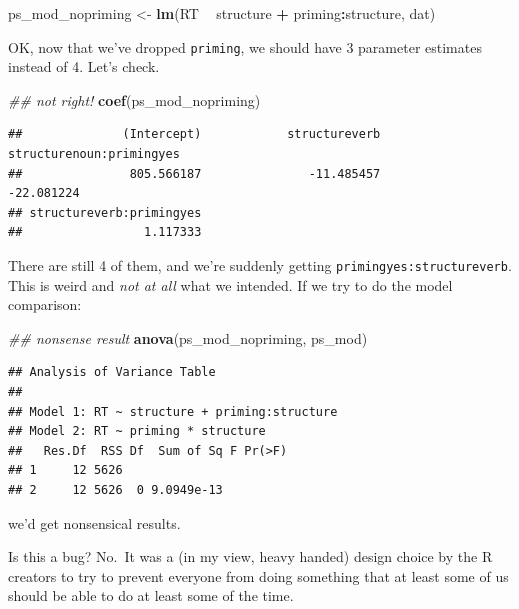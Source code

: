 \documentclass[]{book}
\newenvironment{Shaded}{\begin{snugshade}}{\end{snugshade}}
\newcommand{\CommentTok}[1]{\textcolor[rgb]{0.56,0.35,0.01}{\textit{#1}}}
\newcommand{\KeywordTok}[1]{\textcolor[rgb]{0.13,0.29,0.53}{\textbf{#1}}}
\newcommand{\NormalTok}[1]{#1}
\newcommand{\OperatorTok}[1]{\textcolor[rgb]{0.81,0.36,0.00}{\textbf{#1}}}
\newcommand{\StringTok}[1]{\textcolor[rgb]{0.31,0.60,0.02}{#1}}
\begin{document}
\begin{Shaded}
\begin{Highlighting}[]
\NormalTok{  ps_mod_nopriming <-}\StringTok{ }\KeywordTok{lm}\NormalTok{(RT }\OperatorTok{~}\StringTok{ }\NormalTok{structure }\OperatorTok{+}\StringTok{ }\NormalTok{priming}\OperatorTok{:}\NormalTok{structure, dat)}
\end{Highlighting}
\end{Shaded}

OK, now that we've dropped \texttt{priming}, we should have 3 parameter estimates instead of 4. Let's check.

\begin{Shaded}
\begin{Highlighting}[]
  \CommentTok{## not right!}
  \KeywordTok{coef}\NormalTok{(ps_mod_nopriming)}
\end{Highlighting}
\end{Shaded}

\begin{verbatim}
##              (Intercept)            structureverb structurenoun:primingyes 
##               805.566187               -11.485457               -22.081224 
## structureverb:primingyes 
##                 1.117333
\end{verbatim}

There are still 4 of them, and we're suddenly getting \texttt{primingyes:structureverb}. This is weird and \emph{not at all} what we intended. If we try to do the model comparison:

\begin{Shaded}
\begin{Highlighting}[]
  \CommentTok{## nonsense result}
  \KeywordTok{anova}\NormalTok{(ps_mod_nopriming, ps_mod)}
\end{Highlighting}
\end{Shaded}

\begin{verbatim}
## Analysis of Variance Table
## 
## Model 1: RT ~ structure + priming:structure
## Model 2: RT ~ priming * structure
##   Res.Df  RSS Df  Sum of Sq F Pr(>F)
## 1     12 5626                       
## 2     12 5626  0 9.0949e-13
\end{verbatim}

we'd get nonsensical results.

Is this a bug? No.~It was a (in my view, heavy handed) design choice by the R creators to try to prevent everyone from doing something that at least some of us should be able to do at least some of the time.
\end{document}
